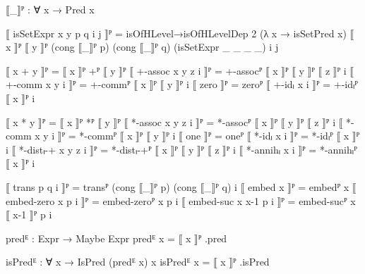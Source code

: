 \begin{code}
  ⟦_⟧ᴾ : ∀ x → Pred x
\end{code}
\begin{code}[hide]
  ⟦ isSetExpr x y p q i j ⟧ᴾ =
    isOfHLevel→isOfHLevelDep 2 (λ x → isSetPred x)
      ⟦ x ⟧ᴾ ⟦ y ⟧ᴾ (cong ⟦_⟧ᴾ p) (cong ⟦_⟧ᴾ q) (isSetExpr _ _ _ _) i j

  ⟦ x + y ⟧ᴾ = ⟦ x ⟧ᴾ +ᴾ ⟦ y ⟧ᴾ
  ⟦ +-assoc x y z i ⟧ᴾ = +-assocᴾ ⟦ x ⟧ᴾ ⟦ y ⟧ᴾ ⟦ z ⟧ᴾ i
  ⟦ +-comm x y i ⟧ᴾ = +-commᴾ ⟦ x ⟧ᴾ ⟦ y ⟧ᴾ i
  ⟦ zero ⟧ᴾ = zeroᴾ
  ⟦ +-idₗ x i ⟧ᴾ = +-idₗᴾ ⟦ x ⟧ᴾ i

  ⟦ x * y ⟧ᴾ = ⟦ x ⟧ᴾ *ᴾ ⟦ y ⟧ᴾ
  ⟦ *-assoc x y z i ⟧ᴾ = *-assocᴾ ⟦ x ⟧ᴾ ⟦ y ⟧ᴾ ⟦ z ⟧ᴾ i
  ⟦ *-comm x y i ⟧ᴾ = *-commᴾ ⟦ x ⟧ᴾ ⟦ y ⟧ᴾ i
  ⟦ one ⟧ᴾ = oneᴾ
  ⟦ *-idₗ x i ⟧ᴾ = *-idₗᴾ ⟦ x ⟧ᴾ i
  ⟦ *-distₗ-+ x y z i ⟧ᴾ = *-distₗ-+ᴾ ⟦ x ⟧ᴾ ⟦ y ⟧ᴾ ⟦ z ⟧ᴾ i
  ⟦ *-annihₗ x i ⟧ᴾ = *-annihₗᴾ ⟦ x ⟧ᴾ i

  ⟦ trans p q i ⟧ᴾ = transᴾ (cong ⟦_⟧ᴾ p) (cong ⟦_⟧ᴾ q) i
  ⟦ embed x ⟧ᴾ = embedᴾ x
  ⟦ embed-zero x p i ⟧ᴾ = embed-zeroᴾ x p i
  ⟦ embed-suc x x-1 p i ⟧ᴾ = embed-sucᴾ x ⟦ x-1 ⟧ᴾ p i
\end{code}
\begin{code}
  predᴱ : Expr → Maybe Expr
  predᴱ x = ⟦ x ⟧ᴾ .pred

  isPredᴱ : ∀ x → IsPred (predᴱ x) x
  isPredᴱ x = ⟦ x ⟧ᴾ .isPred
\end{code}

